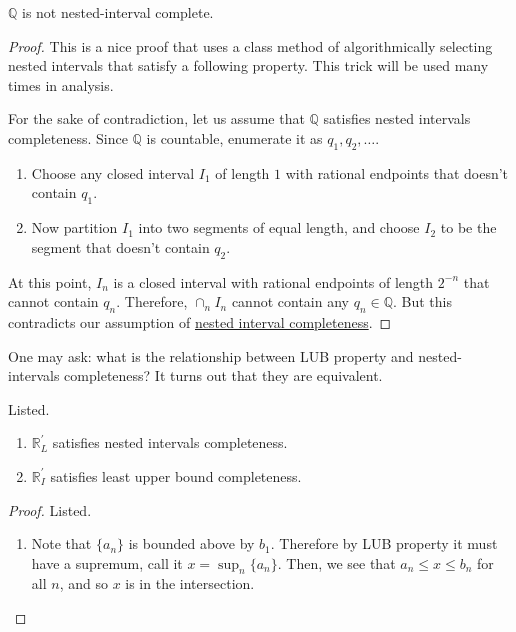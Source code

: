   \begin{theorem}
    \label{thm:rationals-are-not-nested-interval-complete}
    $\mathbb{Q}$ is not nested-interval complete. 
  \end{theorem}
  \begin{proof}
    This is a nice proof that uses a class method of algorithmically selecting nested intervals that satisfy a following property. This trick will be used many times in analysis. 
    
    For the sake of contradiction, let us assume that $\mathbb{Q}$ satisfies nested intervals completeness. Since $\mathbb{Q}$ is countable, enumerate it as $q_1, q_2, \ldots$. 
    \begin{enumerate}
      \item Choose any closed interval $I_1$ of length $1$ with rational endpoints that doesn't contain $q_1$. 
      \item Now partition $I_1$ into two segments of equal length, and choose $I_2$ to be the segment that doesn't contain $q_2$.  
    \end{enumerate}
    At this point, $I_n$ is a closed interval with rational endpoints of length $2^{-n}$ that cannot contain $q_n$. Therefore, $\cap_n I_n$ cannot contain any $q_n \in \mathbb{Q}$. But this contradicts our assumption of \hyperref[def:nested-interval-completeness]{nested interval completeness}.  
  \end{proof} 

  One may ask: what is the relationship between LUB property and nested-intervals completeness? It turns out that they are equivalent. 

  \begin{theorem}
    \label{thm:lub-is-equivalent-to-nested-interval}
    Listed. 
    \begin{enumerate}
      \item $\mathbb{R}_L^\prime$ satisfies nested intervals completeness. 
      \item $\mathbb{R}_I^\prime$ satisfies least upper bound completeness. 
    \end{enumerate}
  \end{theorem}
  \begin{proof}
    Listed. 
    \begin{enumerate}
      \item Note that $\{a_n\}$ is bounded above by $b_1$. Therefore by LUB property it must have a supremum, call it $x = \sup_n \{a_n\}$. Then, we see that $a_n \leq x \leq b_n$ for all $n$, and so $x$ is in the intersection. 
    \end{enumerate}
  \end{proof}

